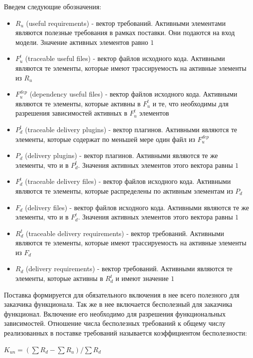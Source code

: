 \documentclass{article}
\begin{document}
  Введем следующие обозначения:
  \begin{itemize}
    \item $R_{u}$ (useful requirements) - вектор требований. Активными элементами являются полезные требования в рамках поставки. Они подаются на вход модели. Значение активных элементов равно $1$
    \item $F^{t}_{u}$ (traceable useful files) - вектор файлов исходного кода. Активными являются те элементы, которые имеют трассируемость на активные элементы из $R_{u}$
    \item $F^{dep}_{u}$ (dependency useful files) - вектор файлов исходного кода. Активными являются те элементы, которые активны в $F^{t}_{u}$ и те, что необходимы для разрешения зависимостей активных в $F^{t}_{u}$ элементов
    \item $P^{t}_{d}$ (traceable delivery plugins) - вектор плагинов. Активными являются те элементы, которые содержат по меньшей мере один файл из $F^{dep}_{u}$
    \item $P_{d}$ (delivery plugins) - вектор плагинов. Активными являются те же элементы, что и в $P^{t}_{d}$. Значения активных элементов этого вектора равны $1$
    \item $F^{t}_{d}$ (traceable delivery files) - вектор файлов исходного кода. Активными являются те элементы, которые распределены по активным элементам из $P_{d}$
    \item $F_{d}$ (delivery files) - вектор файлов исходного кода. Активными являются те же элементы, что и в $F^{t}_{d}$. Значения активных элементов этого вектора равны $1$
    \item $R^{t}_{d}$ (traceable delivery requirements) - вектор требований. Активными являются те элементы, которые имеют трассируемость на активные элементы из $F_{d}$
    \item $R_{d}$ (delivery requirements) - вектор требований. Активными являются те элементы, которые активны в $R^{t}_{d}$ и имеют значение $1$
  \end{itemize}

  Поставка формируется для обязательного включения в нее всего полезного для заказчика функционала. Так же в нее включается бесполезный для заказчика функционал. Включение его необходимо для разрешения функциональных зависимостей. Отношение числа бесполезных требований к общему числу реализованных в поставке требований называется коэффициентом бесполезности: 
  \begin{center}
    $K_{un} = (\sum R_{d} - \sum R_{u}) / \sum R_{d}$ 
  \end{center}
  
\end{document}
